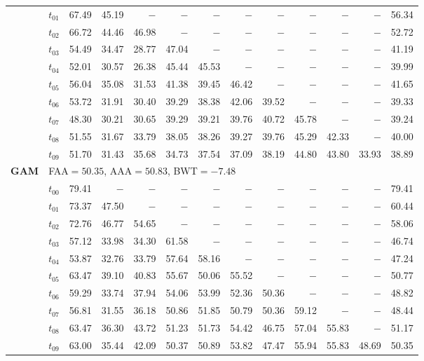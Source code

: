 \begin{table}[ht]
\begin{tabular}{@{}l l r r r r r r r r r r r@{}}
 & $t_{01}$ & 67.49 & 45.19 & $-$ & $-$ & $-$ & $-$ & $-$ & $-$ & $-$ & $-$ & 56.34 \\
 & $t_{02}$ & 66.72 & 44.46 & 46.98 & $-$ & $-$ & $-$ & $-$ & $-$ & $-$ & $-$ & 52.72 \\
 & $t_{03}$ & 54.49 & 34.47 & 28.77 & 47.04 & $-$ & $-$ & $-$ & $-$ & $-$ & $-$ & 41.19 \\
 & $t_{04}$ & 52.01 & 30.57 & 26.38 & 45.44 & 45.53 & $-$ & $-$ & $-$ & $-$ & $-$ & 39.99 \\
 & $t_{05}$ & 56.04 & 35.08 & 31.53 & 41.38 & 39.45 & 46.42 & $-$ & $-$ & $-$ & $-$ & 41.65 \\
 & $t_{06}$ & 53.72 & 31.91 & 30.40 & 39.29 & 38.38 & 42.06 & 39.52 & $-$ & $-$ & $-$ & 39.33 \\
 & $t_{07}$ & 48.30 & 30.21 & 30.65 & 39.29 & 39.21 & 39.76 & 40.72 & 45.78 & $-$ & $-$ & 39.24 \\
 & $t_{08}$ & 51.55 & 31.67 & 33.79 & 38.05 & 38.26 & 39.27 & 39.76 & 45.29 & 42.33 & $-$ & 40.00 \\
 & $t_{09}$ & 51.70 & 31.43 & 35.68 & 34.73 & 37.54 & 37.09 & 38.19 & 44.80 & 43.80 & 33.93 & 38.89 \\
\midrule
\multirow{11}{*}{\textbf{GAM}} & \multicolumn{12}{l}{\quad\small FAA$=50.35$,\; AAA$=50.83$,\; BWT$=-7.48$} \\
 & $t_{00}$ & 79.41 & $-$ & $-$ & $-$ & $-$ & $-$ & $-$ & $-$ & $-$ & $-$ & 79.41 \\
 & $t_{01}$ & 73.37 & 47.50 & $-$ & $-$ & $-$ & $-$ & $-$ & $-$ & $-$ & $-$ & 60.44 \\
 & $t_{02}$ & 72.76 & 46.77 & 54.65 & $-$ & $-$ & $-$ & $-$ & $-$ & $-$ & $-$ & 58.06 \\
 & $t_{03}$ & 57.12 & 33.98 & 34.30 & 61.58 & $-$ & $-$ & $-$ & $-$ & $-$ & $-$ & 46.74 \\
 & $t_{04}$ & 53.87 & 32.76 & 33.79 & 57.64 & 58.16 & $-$ & $-$ & $-$ & $-$ & $-$ & 47.24 \\
 & $t_{05}$ & 63.47 & 39.10 & 40.83 & 55.67 & 50.06 & 55.52 & $-$ & $-$ & $-$ & $-$ & 50.77 \\
 & $t_{06}$ & 59.29 & 33.74 & 37.94 & 54.06 & 53.99 & 52.36 & 50.36 & $-$ & $-$ & $-$ & 48.82 \\
 & $t_{07}$ & 56.81 & 31.55 & 36.18 & 50.86 & 51.85 & 50.79 & 50.36 & 59.12 & $-$ & $-$ & 48.44 \\
 & $t_{08}$ & 63.47 & 36.30 & 43.72 & 51.23 & 51.73 & 54.42 & 46.75 & 57.04 & 55.83 & $-$ & 51.17 \\
 & $t_{09}$ & 63.00 & 35.44 & 42.09 & 50.37 & 50.89 & 53.82 & 47.47 & 55.94 & 55.83 & 48.69 & 50.35 \\

\end{tabular}
\end{table}
